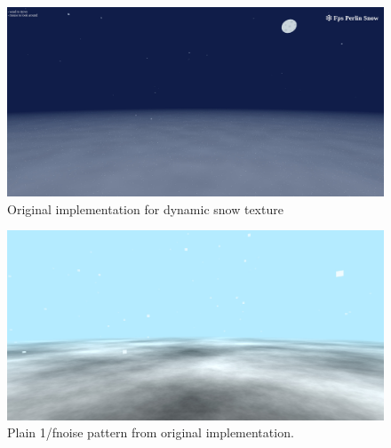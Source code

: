 \documentclass{IEEEtran}
\begin{document}
\begin{figure}
  \includegraphics[width=\linewidth]{original.jpg}
  \caption{Original implementation for dynamic snow texture}
  \label{fig:original}
\end{figure}

\begin{figure}
  \includegraphics[width=\linewidth]{fnoise.jpg}
  \caption{Plain 1/fnoise pattern from original implementation.}
  \label{fig:fnoise}
\end{figure}
\end{document}
